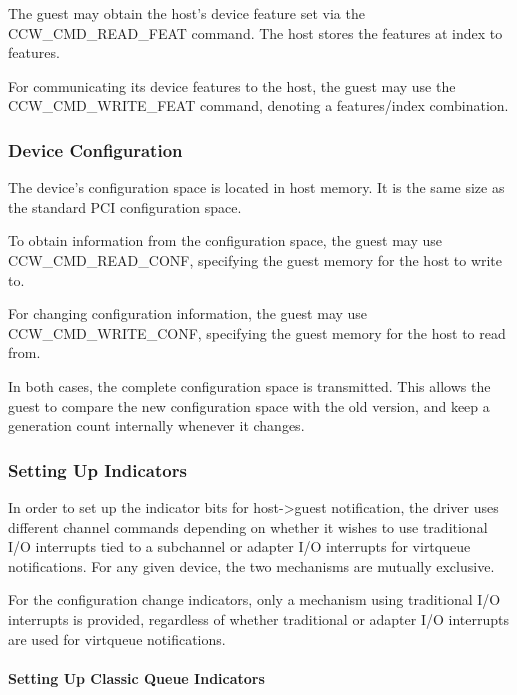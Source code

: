 The guest may obtain the host's device feature set via the
CCW_CMD_READ_FEAT command. The host stores the features at index
to features.

For communicating its device features to the host, the guest may
use the CCW_CMD_WRITE_FEAT command, denoting a features/index
combination.

\subsubsection{Device Configuration}\label{sec:Virtio Transport Options / Virtio over channel I/O / Device Initialization / Device Configuration}

The device's configuration space is located in host memory. It is
the same size as the standard PCI configuration space.

To obtain information from the configuration space, the guest may
use CCW_CMD_READ_CONF, specifying the guest memory for the host
to write to.

For changing configuration information, the guest may use
CCW_CMD_WRITE_CONF, specifying the guest memory for the host to
read from.

In both cases, the complete configuration space is transmitted.  This
allows the guest to compare the new configuration space with the old
version, and keep a generation count internally whenever it changes.

\subsubsection{Setting Up Indicators}\label{sec:Virtio Transport Options / Virtio over channel I/O / Device Initialization / Setting Up Indicators}

In order to set up the indicator bits for host->guest notification,
the driver uses different channel commands depending on whether it
wishes to use traditional I/O interrupts tied to a subchannel or
adapter I/O interrupts for virtqueue notifications. For any given
device, the two mechanisms are mutually exclusive.

For the configuration change indicators, only a mechanism using
traditional I/O interrupts is provided, regardless of whether
traditional or adapter I/O interrupts are used for virtqueue
notifications.

\paragraph{Setting Up Classic Queue Indicators}\label{sec:Virtio Transport Options / Virtio over channel I/O / Device Initialization / Setting Up Indicators / Setting Up Classic Queue Indicators}

